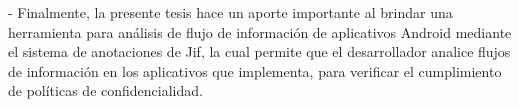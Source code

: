 - Finalmente, la presente tesis hace un aporte importante al brindar una
herramienta para análisis de flujo de información de aplicativos Android
mediante el sistema de anotaciones de Jif, la cual permite que el desarrollador
analice flujos de información en los aplicativos que implementa, para verificar
el cumplimiento de políticas de confidencialidad.

% 




% 

% 


